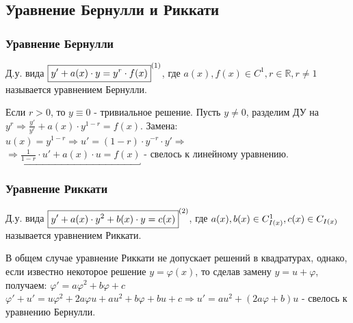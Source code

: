 \subsection{Уравнение Бернулли и Риккати}
\subsubsection{Уравнение Бернулли}

\begin{definition}
	Д.у. вида $ \boxed{y' + a(x)\cdot y = y^r \cdot f(x)}^{\eqnum\label{eq:Ber}} $, где $ a(x), f(x) \in C^1, r \in \mathbb{ R }, r \neq 1$ называется уравнением Бернулли. \\
\end{definition}

\begin{proposition} %
	Если $ r > 0 $, то $ y \equiv 0 $ - тривиальное решение. Пусть $ y \neq 0$, разделим ДУ на $ y^r \Rightarrow \frac{ y' }{ y^r } + a(x) \cdot y^{ 1-r } = f(x).$ Замена: $ u(x) = y^{ 1-r } \Rightarrow u' = ( 1-r ) \cdot y^{ -r } \cdot y' \Rightarrow$ \\ $\Rightarrow \underbracket{ \frac{ 1 }{ 1-r } \cdot u' + a(x)\cdot u = f(x) }$ - свелось к линейному уравнению. 
\end{proposition}

\subsubsection{Уравнение Риккати}

\begin{definition}
	Д.у. вида $ \boxed{y' + a(x) \cdot y^2 + b(x) \cdot y = c(x)}^{\eqnum\label{eq:Ric}} $, где $a(x),  b(x) \in C^1_{I(x)},  \\ c(x) \in C_{I(x)}$ называется уравнением Риккати. 
\end{definition}

\begin{proposition}	
	В общем случае уравнение Риккати не допускает решений в квадратурах, однако, если известно некоторое решение $ y = \varphi (x) $, то сделав замену $ y = u + \varphi $, получаем: $ \varphi' = a \varphi^2 + b\varphi + c $ \\ $ \varphi' + u' = u\varphi^2 + 2a\varphi u + au^2 + b\varphi + bu + c \Rightarrow u' = au^2 + (2a\varphi + b)u $ - свелось к уравнению Бернулли.
\end{proposition}

